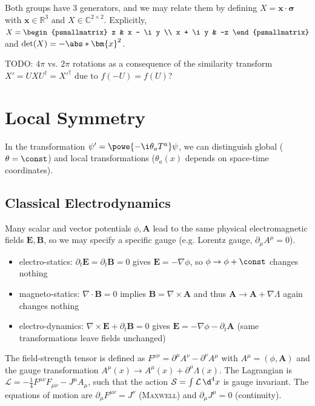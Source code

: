 \documentclass[english, parskip=full]{scrbook}
\newcommand{\example}[3]{\begin{tcolorbox}[colback=colorbackgroundexample,colframe=colorexample, breakable,enhanced,title={\textbf{#1}: #2.}]#3\end{tcolorbox}}
\begin{document}
\example{Relation between $SU(2)$ and $SO(3)$}{Rotations}{
Both groups have 3 generators, and we may relate them by defining $X=\bm{x}\cdot \bm{\sigma}$ with $\bm{x} \in \mathbb{R}^3$ and $X\in\mathbb{C}^{2\times 2}$.
Explicitly, $X = \begin{psmallmatrix} z & x - \i y \\ x + \i y & -z \end{psmallmatrix}$ and $\det(X) = -\abs*{\bm{x}}^2$.

TODO: $4\pi$ vs. $2\pi$ rotations as a consequence of the similarity transform $X'=UXU^\dagger = X'^\dagger$ due to $f(-U)=f(U)$?
}
\chapter{Local Symmetry}
In the transformation $\psi'=\powe{-\i \theta_a T^a}\psi$, we can distinguish global ($\theta=\const$) and local transformations ($\theta_a(x)$ depends on space-time coordinates).
\section{Classical Electrodynamics}
Many scalar and vector potentials $\phi,\bm{A}$ lead to the same physical electromagnetic fields $\bm{E},\bm{B}$, so we may specify a specific gauge (e.g. Lorentz gauge, $\partial_\mu A^\mu=0$).
\begin{itemize}
\item electro-statics: $\partial_t \bm{E} = \partial_t \bm{B} = 0$ gives $\bm{E}=-\nabla\phi$, so $\phi \rightarrow \phi + \const$ changes nothing
\item magneto-statics: $\nabla\cdot \bm{B} = 0$ implies $\bm{B}=\nabla\times \bm{A}$ and thus $\bm{A}\rightarrow \bm{A} + \nabla \Lambda$ again changes nothing
\item electro-dynamics: $\nabla\times \bm{E} + \partial_t \bm{B} = 0$ gives $\bm{E}=-\nabla\phi - \partial_t\bm{A}$ (same transformations leave fields unchanged)
\end{itemize}
The field-strength tensor is defined as $F^{\mu\nu} = \partial^\mu A^\nu - \partial^\nu A^\mu$ with $A^\mu =(\phi,\bm{A})$ and the gauge transformation $A^\mu(x)\rightarrow A^\mu(x)+\partial^\mu \Lambda(x)$.
The Lagrangian is $\mathcal{L} = -\frac{1}{4} F^{\mu\nu} F_{\mu\nu} - J^\mu A_\mu$, such that the action $\mathcal{S} = \int \mathcal{L}\,\d^4x$ is gauge invariant.
The equations of motion are $\partial_\mu F^{\mu\nu}=J^\nu$ (\textsc{Maxwell}) and $\partial_\mu J^\mu = 0$ (continuity).
\end{document}
